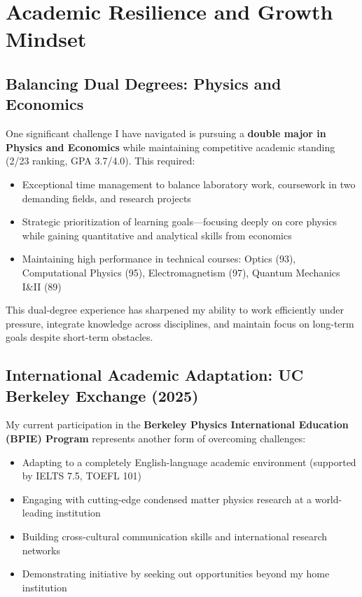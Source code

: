 \documentclass[11pt,a4paper]{article}
\begin{document}
\section{Academic Resilience and Growth Mindset}

\subsection{Balancing Dual Degrees: Physics and Economics}

One significant challenge I have navigated is pursuing a \textbf{double major in Physics and Economics} while maintaining competitive academic standing (2/23 ranking, GPA 3.7/4.0). This required:
\begin{itemize}
    \item Exceptional time management to balance laboratory work, coursework in two demanding fields, and research projects
    \item Strategic prioritization of learning goals—focusing deeply on core physics while gaining quantitative and analytical skills from economics
    \item Maintaining high performance in technical courses: Optics (93), Computational Physics (95), Electromagnetism (97), Quantum Mechanics I\&II (89)
\end{itemize}

This dual-degree experience has sharpened my ability to work efficiently under pressure, integrate knowledge across disciplines, and maintain focus on long-term goals despite short-term obstacles.

\subsection{International Academic Adaptation: UC Berkeley Exchange (2025)}

My current participation in the \textbf{Berkeley Physics International Education (BPIE) Program} represents another form of overcoming challenges:
\begin{itemize}
    \item Adapting to a completely English-language academic environment (supported by IELTS 7.5, TOEFL 101)
    \item Engaging with cutting-edge condensed matter physics research at a world-leading institution
    \item Building cross-cultural communication skills and international research networks
    \item Demonstrating initiative by seeking out opportunities beyond my home institution
\end{itemize}
\end{document}
